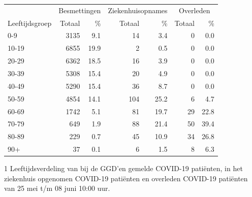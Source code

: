 \documentclass[
  english,
  man,floatsintext]{apa6}
\begin{document}
\begin{table}
\centering\begingroup\fontsize{11}{13}\selectfont

\begin{threeparttable}
\begin{tabular}{lrrrrrr}
\toprule
\multicolumn{1}{c}{ } & \multicolumn{2}{c}{Besmettingen} & \multicolumn{2}{c}{Ziekenhuisopnames} & \multicolumn{2}{c}{Overleden} \\
\cmidrule(l{3pt}r{3pt}){2-3} \cmidrule(l{3pt}r{3pt}){4-5} \cmidrule(l{3pt}r{3pt}){6-7}
Leeftijdsgroep & Totaal & \% & Totaal & \% & Totaal & \%\\
\midrule
0-9 & 3135 & 9.1 & 14 & 3.4 & 0 & 0.0\\
10-19 & 6855 & 19.9 & 2 & 0.5 & 0 & 0.0\\
20-29 & 6362 & 18.5 & 16 & 3.9 & 0 & 0.0\\
30-39 & 5308 & 15.4 & 20 & 4.9 & 0 & 0.0\\
40-49 & 5290 & 15.4 & 36 & 8.7 & 0 & 0.0\\
50-59 & 4854 & 14.1 & 104 & 25.2 & 6 & 4.7\\
60-69 & 1742 & 5.1 & 81 & 19.7 & 29 & 22.8\\
70-79 & 649 & 1.9 & 88 & 21.4 & 50 & 39.4\\
80-89 & 229 & 0.7 & 45 & 10.9 & 34 & 26.8\\
90+ & 37 & 0.1 & 6 & 1.5 & 8 & 6.3\\
\bottomrule
\end{tabular}
\begin{tablenotes}
\item[1] Leeftijdsverdeling van bij de GGD’en gemelde COVID-19 patiënten, in het ziekenhuis opgenomen COVID-19 patiënten en overleden COVID-19 patiënten van 25 mei t/m 08 juni 10:00 uur.
\end{tablenotes}
\end{threeparttable}
\endgroup{}
\end{table}

\newpage
\end{document}
